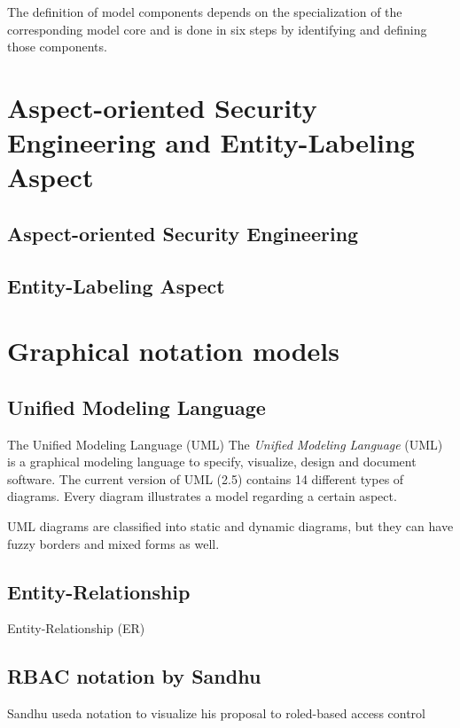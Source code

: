 \documentclass[twoside, openright, 12pt]{book}
\begin{document}
The definition of model components depends on the specialization of the corresponding model core and is done in six steps by identifying and defining those components.



\section{Aspect-oriented Security Engineering and Entity-Labeling Aspect}
\label{AOSEEL}


\subsection{Aspect-oriented Security Engineering}
\label{AOSE}


\subsection{Entity-Labeling Aspect}
\label{EL}




\section{Graphical notation models}
\label{graphical_notations}

\subsection{Unified Modeling Language}
\label{UML}
The Unified Modeling Language (UML)
The \textit{Unified Modeling Language} (UML) is a graphical modeling language to specify, visualize, design and document software.
The current version of UML (2.5) contains 14 different types of diagrams.
Every diagram illustrates a model regarding a certain aspect.

UML diagrams are classified into static and dynamic diagrams, but they can have fuzzy borders and mixed forms as well.

\subsection{Entity-Relationship}
\label{ER}
Entity-Relationship (ER)

\subsection{RBAC notation by Sandhu}
\label{RBAC_notation}
Sandhu useda notation to visualize his proposal to roled-based access control
\end{document}

